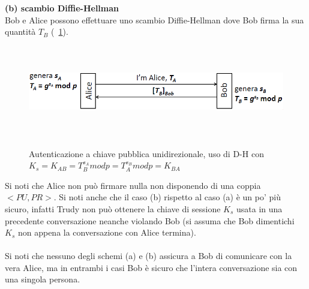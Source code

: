 \textbf{(b) scambio Diffie-Hellman} \\
Bob e Alice possono effettuare uno scambio Diffie-Hellman dove Bob firma la sua quantità $T_{B}$ (\figurename~\ref{fig:ImgS82bis}).
\begin{figure}[htbp]
	\centering%
	\subfigure%
	{\includegraphics[height=4cm, width=12cm, keepaspectratio]{Immagini/autenticazione/ImgS82bis.png}}
	\caption{Autenticazione a chiave pubblica unidirezionale, uso di D-H con $K_{s} = K_{AB} = T_{B}^{s_{A}}modp = T_{A}^{s_{B}}modp = K_{BA}$}\label{fig:ImgS82bis} 	
\end{figure}
Si noti che Alice non può firmare nulla non disponendo di una coppia $<PU, PR>$. Si noti anche che il caso (b) rispetto al caso (a) è un po' più sicuro, infatti Trudy non può ottenere la chiave di sessione $K_{s}$ usata in una precedente conversazione neanche violando Bob (si assuma che Bob dimentichi $K_{s}$ non appena la conversazione con Alice termina).\\ \\
Si noti che nessuno degli schemi (a) e (b) assicura a Bob di comunicare con la vera Alice,  ma in entrambi i casi Bob è sicuro che l'intera conversazione sia con una singola persona.
